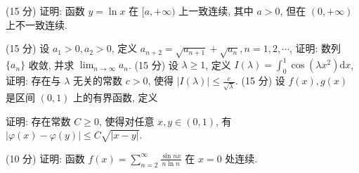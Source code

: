\par{}
(15 分) 证明: 函数 $y = \ln x$ 在 $[a, +\infty)$ 上一致连续, 其中 $a > 0$, 但在 $(0, +\infty)$ 上不一致连续.\par
\par{}
\par{}
(15 分) 设 $a_1 > 0, a_2 > 0$, 定义 $a_{n+2} = \sqrt{a_{n+1}} + \sqrt{a_n}, n = 1, 2, \cdots$, 证明: 数列 $\{a_n\}$ 收敛, 并求 $\lim_{n \to \infty} a_n$.
(15 分) 设 $\lambda \geq 1$, 定义 $I(\lambda) = \int_0^1 \cos(\lambda x^2) \mathrm{d}x$, 证明: 存在与 $\lambda$ 无关的常数 $c > 0$, 使得 $|I(\lambda)| \leq \frac{c}{\sqrt{\lambda}}$.
(15 分) 设 $f(x), g(x)$ 是区间 $(0,1)$ 上的有界函数, 定义\par
\nopagebreak[4]
证明: 存在常数 $C \geq 0$, 使得对任意 $x, y \in (0,1)$, 有 $|\varphi(x) - \varphi(y)| \leq C \sqrt{|x - y|}$.\par
\par{}
(10 分) 证明: 函数 $f(x) = \sum_{n=2}^{\infty} \frac{\sin nx}{n \ln n}$ 在 $x = 0$ 处连续.\par
